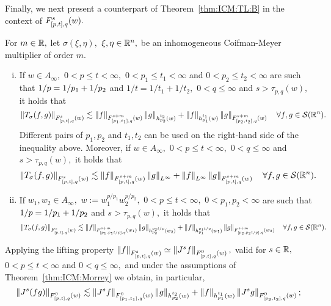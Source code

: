 Finally, we next present a counterpart  of Theorem~\ref{thm:ICM:TL:B} in the context of  $\itlw{[p,t]}{s}{q}{w}.$ 

\begin{theorem}\label{thm:ICM:Morrey}  For $m \in \re,$ let $\sigma(\xi,\eta),$ $\xi,\eta\in\rn,$ be an inhomogeneous Coifman-Meyer multiplier of order $m.$ 
\begin{enumerate}[(i)]
\item If $w\in A_\infty,$ $0<p\le t<\infty,$ $0<p_1\le t_1<\infty$ and $0<p_2\le t_2<\infty$  are  such that $\hcline$ and $1/t=1/t_1+1/t_2,$  $0 < q \le \infty$  and  $s > \tau_{p,q}(w),$  it holds that
\begin{equation*}
\norm{T_\sigma(f,g)}{\itlw{[p,t]}{s}{q}{w}} \lesssim \norm{f}{\itlw{[p_1,t_1]}{s+m}{q}{w}} \norm{g}{h_{p_2}^{t_2}(w)} +  \norm{f}{h_{p_1}^{t_1}(w)}   \norm{g}{\itlw{[p_2,t_2]}{s+m}{q}{w}} \quad \forall f, g \in \sw.
\end{equation*}
Different pairs of $p_1,p_2$ and $t_1, t_2$ can be used on the right-hand side of the inequality above. 
Moreover, if $w\in A_\infty,$ $0<p\le t<\infty,$ $0<q\le \infty$   and $s > \tau_{p,q}(w),$  it holds that
\begin{equation*}
\norm{T_\sigma(f,g)}{\itlw{[p,t]}{s}{q}{w}} \lesssim \norm{f}{\itlw{[p,t]}{s+m}{q}{w}} \norm{g}{L^\infty} +  \norm{f}{L^\infty}   \norm{g}{\itlw{[p,t]}{s+m}{q}{w}} \quad \forall f, g \in \sw.
\end{equation*}
\item If $w_1,w_2\in A_{\infty},$ $w:=w_1^{p/p_1}w_2^{p/p_2},$ $0<p\le t<\infty,$ $0<p_1,p_2<\infty$ are such that $\hcline$ and $s> \tau_{p,q}(w),$ it holds that
\begin{equation*}
\norm{T_\sigma(f,g)}{\itlw{[p,t]}{s}{q}{w}} \lesssim \norm{f}{\itlw{[p_1,p_1t/p]}{s+m}{q}{w_1}} \norm{g}{h_{p_2}^{p_2t/p}(w_2)} +  \norm{f}{h_{p_1}^{p_1t/p}(w_1)}   \norm{g}{\itlw{[p_2,p_2t/p]}{s+m}{q}{w_2}} \quad \forall f, g \in \sw.
\end{equation*}
\end{enumerate}
\end{theorem}
Applying the lifting property $ \norm{f}{\itl{[p,t]}{s}{q}(w)}\simeq\norm{J^s f}{\itl{[p,t]}{0}{q}(w)},$ valid for $s \in \re,$ $0<p\le t<\infty$ and  $0<q\le \infty,$ and under the assumptions  of Theorem~\ref{thm:ICM:Morrey} we obtain, in particular,
\begin{equation}
\norm{J^s(fg)}{\itlw{[p,t]}{0}{q}{w}} \lesssim \norm{J^sf}{\itlw{[p_1,t_1]}{0}{q}{w}} \norm{g}{h_{p_2}^{t_2}(w)} +  \norm{f}{h_{p_1}^{t_1}(w)}   \norm{J^sg}{\itlw{[p_2,t_2]}{0}{q}{w}};\label{eq:ktmorrey}
\end{equation}
